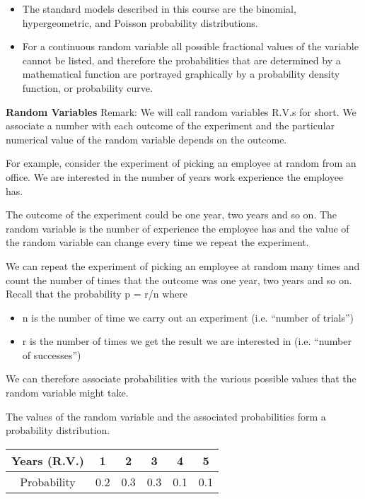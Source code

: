 \documentclass[]{report}
\begin{document}
{\begin{itemize}
\item  The standard models described in this course are
the binomial, hypergeometric, and Poisson probability distributions.

\item For a continuous random variable all possible fractional values of the variable cannot be listed, and
therefore the probabilities that are determined by a mathematical function are portrayed graphically by a
probability density function, or probability curve.
\end{itemize}









\noindent \textbf{Random Variables}
Remark: We will call random variables R.V.s for short.
We associate a number with each outcome of the experiment and the particular numerical value of the random variable depends on the outcome.

For example, consider the experiment of picking an employee at random from an office. We are interested in the number of years work experience the employee has.


The outcome of the experiment could be one year, two years and so on. The random variable is the number of experience the employee has and the value of the random variable can change every time we repeat the experiment.


We can repeat the experiment of picking an employee at random many times and count the number of times that the outcome was one year, two years and so on.
Recall that the probability p = r/n where

\begin{itemize}
	\item n is the number of time we carry out an experiment (i.e.    “number of trials”) 
	\item r is the number of times we get the result we are interested in (i.e. “number of successes”)
	
	
\end{itemize}



We can therefore associate probabilities with the various possible values that the random variable might take.

The values of the random variable and the associated probabilities form a probability distribution.

\begin{center}
\begin{tabular}{|c|c|c|c|c|c|} \hline
Years (R.V.)   & 1& 2& 3& 4& 5\\ \hline 
Probability& 0.2& 0.3& 0.3& 0.1& 0.1\\ \hline 
\end{tabular} 
\end{center}


}
\end{document}
